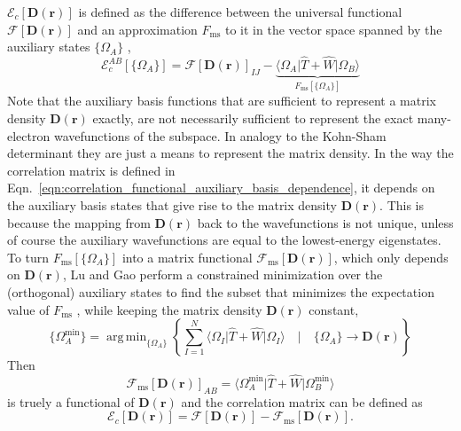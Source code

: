 \documentclass[journal=jpclcd,manuscript=letter]{achemso}
\DeclareMathOperator*{\argmin}{arg\,min}
\newcommand\m[1]{\mathbf{#1}}
\renewcommand\vec[1]{\mathbf{#1}}
\begin{document}
$\mathcal{E}_{c}[\m{D}(\vec{r})]$ is defined
as the difference between the universal functional $\mathcal{F}[\m{D}(\vec{r})]$ and an approximation $F_{\text{ms}}$ to it in the vector space spanned
by the auxiliary states $\{\Omega_A\}$
\cite[Eqn.~(30)]{Lu2022fundamental},
\begin{equation}
\mathcal{E}^{AB}_c[\{\Omega_A\}] = \mathcal{F}[\m{D}(\vec{r})]_{IJ}
- \underbrace{\langle \Omega_A \vert \hat{T} + \hat{W} \vert \Omega_B \rangle}_{F_{\text{ms}}[\{\Omega_A\}]}
\label{eqn:correlation_functional_auxiliary_basis_dependence}
\end{equation}
Note that the auxiliary basis functions that are sufficient to represent a matrix density $\m{D}(\vec{r})$ exactly, are not necessarily sufficient
to represent the exact many-electron wavefunctions of the subspace. In analogy to the Kohn-Sham determinant they are just a means to represent
the matrix density. In the way the correlation matrix is defined in Eqn.~\ref{eqn:correlation_functional_auxiliary_basis_dependence},
it depends on the auxiliary basis states that give rise to the matrix density $\m{D}(\vec{r})$. This is because the mapping from $\m{D}(\vec{r})$ back to
the wavefunctions is not unique, unless of course the auxiliary wavefunctions are equal to the lowest-energy eigenstates.
To turn $F_{\text{ms}}[\{\Omega_A\}]$
into a matrix functional $\mathcal{F}_{\text{ms}}[\m{D}(\vec{r})]$, which only depends on $\m{D}(\vec{r})$, Lu and Gao \cite{Lu2022fundamental} perform a
constrained minimization over the (orthogonal) auxiliary states to find the subset that minimizes the expectation value of $F_{\text{ms}}$
\cite[Eqn.~(28)]{Lu2022fundamental}, while keeping the matrix density $\m{D}(\vec{r})$ constant,
\begin{equation}
  \{\Omega_A^{\text{min}}\} = \argmin_{\{\Omega_A\}} \left\{ \sum_{I=1}^{N} 
    \langle \Omega_I \vert \hat{T} + \hat{W} \vert \Omega_I \rangle \quad \Big\vert \quad \{\Omega_A\} \to \m{D}(\vec{r}) \right\}
    \label{eqn:constrained_search}
\end{equation}
Then 
\begin{equation}
\mathcal{F}_{\text{ms}}[\m{D}(\vec{r})]_{AB} = \langle \Omega_A^{\text{min}} \vert \hat{T} + \hat{W} \vert \Omega_B^{\text{min}} \rangle
\end{equation}
is truely a functional of $\m{D}(\vec{r})$ and the correlation matrix can be defined as
\begin{equation}
 \mathcal{E}_{c}[\m{D}(\vec{r})] = \mathcal{F}[\m{D}(\vec{r})] - \mathcal{F}_{\text{ms}}[\m{D}(\vec{r})].
 \label{eqn:correlation_functional_matrix_functional}
\end{equation}
\end{document}
